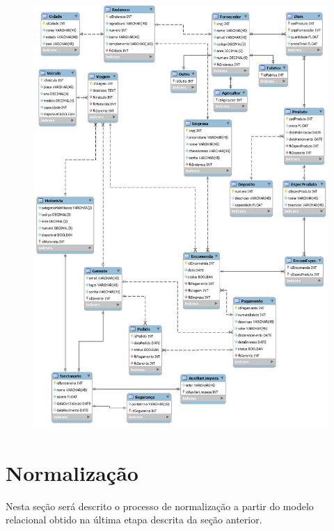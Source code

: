 \documentclass[12pt, onecolumn, titlepage]{article}
\begin{document}
\newpage
\begin{figure}[H]
  \centering
  \includegraphics[scale=0.5]{modelo-relacional.png}
  \label{figRotulo}
\end{figure}

\newpage
\section{Normalização}
\label{sect:normalizacao}
Nesta seção será descrito o processo de normalização a partir do modelo relacional obtido na última etapa descrita da seção anterior.
\end{document}

